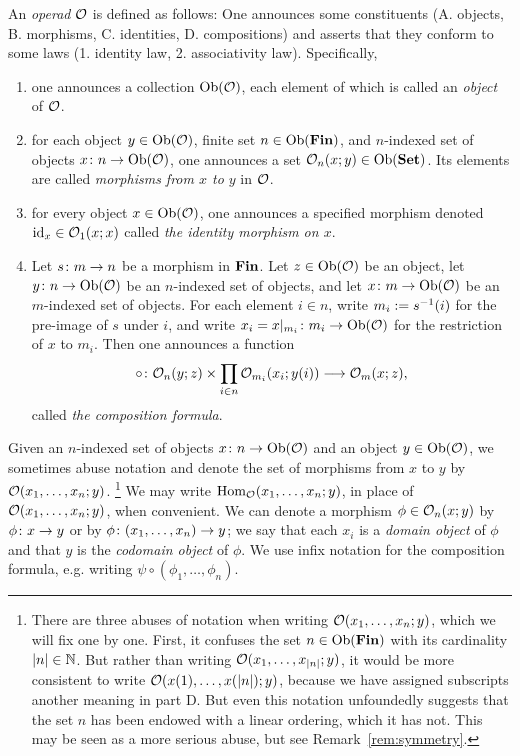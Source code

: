\documentclass[CT4S-EN-RU]{subfiles}
\begin{document}
\begin{blockRUS}
\end{blockRUS}

\begin{definitionENG}\label{def:operad}
An {\em operad} $\mathcal{O}$ is defined as follows: One announces some constituents (A. objects, B. morphisms, C. identities, D. compositions) and asserts that they conform to some laws (1. identity law, 2. associativity law). Specifically, 
\begin{enumerate}[\hsp A.]
\item one announces a collection $\textnormal{Ob}(\mathcal{O})$, each element of which is called an {\em object} of $\mathcal{O}$.
\item for each object $y\in\textnormal{Ob}(\mathcal{O})$, finite set $n\in\textnormal{Ob}({\mathbf{Fin}})$, and $n$-indexed set of objects $x\colon n\rightarrow\textnormal{Ob}(\mathcal{O})$, one announces a set $\mathcal{O}_n(x;y)\in\textnormal{Ob}({\mathbf{Set}})$. Its elements are called {\em morphisms from $x$ to $y$} in $\mathcal{O}$. 
\item for every object $x\in\textnormal{Ob}(\mathcal{O})$, one announces a specified morphism denoted $\textnormal{id}_x\in\mathcal{O}_1(x;x)$ called {\em the identity morphism on $x$}.
\item Let $s\colon m\rightarrow n$ be a morphism in ${\mathbf{Fin}}$. Let $z\in\textnormal{Ob}(\mathcal{O})$ be an object, let $y\colon n\rightarrow\textnormal{Ob}(\mathcal{O})$ be an $n$-indexed set of objects, and let $x\colon m\rightarrow\textnormal{Ob}(\mathcal{O})$ be an $m$-indexed set of objects. For each element $i\in n$, write $m_i:=s^\m1(i)$ for the pre-image of $s$ under $i$, and write $x_i=x|_{m_i}\colon m_i\rightarrow\textnormal{Ob}(\mathcal{O})$ for the restriction of $x$ to $m_i$. Then one announces a function 
\begin{align}\label{dia:composition formula}
\circ\colon\mathcal{O}_n(y;z)\times\prod_{i\in n}\mathcal{O}_{m_i}(x_i;y(i))\longrightarrow\mathcal{O}_{m}(x;z),
\end{align} 
called {\em the composition formula}.
\end{enumerate}
Given an $n$-indexed set of objects $x\colon n\rightarrow\textnormal{Ob}(\mathcal{O})$ and an object $y\in\textnormal{Ob}(\mathcal{O})$, we sometimes abuse notation and denote the set of morphisms from $x$ to $y$ by $\mathcal{O}(x_1,\ldots,x_n;y)$.
\footnote{There are three abuses of notation when writing $\mathcal{O}(x_1,\ldots,x_n;y)$, which we will fix one by one. First, it confuses the set $n\in\textnormal{Ob}({\mathbf{Fin}})$ with its cardinality $|n|\in{\mathbb N}$. But rather than writing $\mathcal{O}(x_1,\ldots,x_{|n|};y)$, it would be more consistent to write $\mathcal{O}(x(1),\ldots,x(|n|);y)$, because we have assigned subscripts another meaning in part D. But even this notation unfoundedly suggests that the set $n$ has been endowed with a linear ordering, which it has not. This may be seen as a more serious abuse, but see Remark~\ref{rem:symmetry}.}
We may write $\textnormal{Hom}_\mathcal{O}(x_1,\ldots,x_n;y)$, in place of $\mathcal{O}(x_1,\ldots,x_n;y)$, when convenient. We can denote a morphism $\phi\in\mathcal{O}_n(x;y)$ by $\phi\colon x\rightarrow y$ or by $\phi\colon (x_1,\ldots,x_n)\rightarrow y$; we say that each $x_i$ is a {\em domain object} of $\phi$ and that $y$ is the {\em codomain object} of $\phi$. We use infix notation for the composition formula, e.g. writing $\psi\circ(\phi_1,\ldots,\phi_n)$.


\end{definitionENG}
\end{document}
